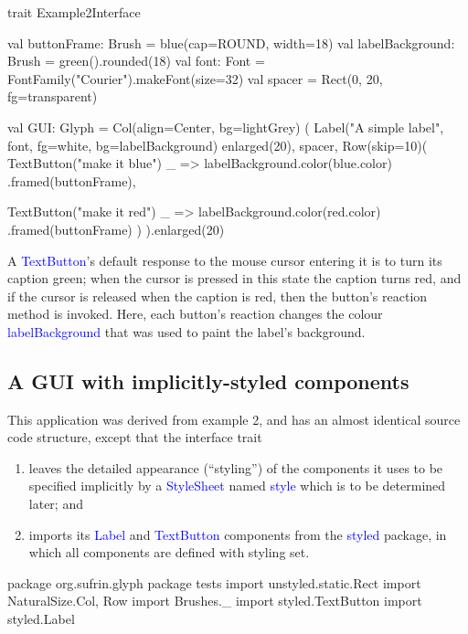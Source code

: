 \documentclass[12pt,a4paper]{article}
\def\Scala#1{\textcolor{blue}{\textsf{#1}}}
\def\SS#1{\subsection{#1}}
\begin{document}
\begin{scala}
trait Example2Interface {
  val buttonFrame: Brush =
        blue(cap=ROUND, width=18)
  val labelBackground: Brush =
        green().rounded(18)
  val font: Font  =
        FontFamily("Courier").makeFont(size=32)
  val spacer =
      Rect(0, 20, fg=transparent)

  val GUI: Glyph = Col(align=Center, bg=lightGrey) (
    Label("A simple label", font,
          fg=white,
          bg=labelBackground) enlarged(20),
    spacer,
    Row(skip=10)(
        TextButton("make it blue")
           { _ => labelBackground.color(blue.color) }
           .framed(buttonFrame),
           
        TextButton("make it red")
           { _ => labelBackground.color(red.color) }
           .framed(buttonFrame)
    )
  ).enlarged(20)
}
\end{scala}

A \Scala{TextButton}'s default response to the mouse cursor entering
it is to turn its caption green; when the cursor is pressed in this
state the caption turns red, and if the cursor is released when the
caption is red, then the button's reaction method is invoked. Here,
each button's reaction changes the colour \Scala{labelBackground} that
was used to paint the label's background.




\clearpage
\SS{A GUI with implicitly-styled components}

This application was derived from example 2, and has an almost
identical source code structure, except that the interface trait
\begin{enumerate}
\item leaves the detailed appearance (``styling'') of the
      components it uses to be specified implicitly by a
      \Scala{StyleSheet} named \Scala{style}
      which is to be determined later; and
\item imports its \Scala{Label} and \Scala{TextButton}
      components from the \Scala{styled} package, in which
      all components are defined with styling set. 
\end{enumerate}

\begin{scala}
package org.sufrin.glyph
package tests
import unstyled.static.Rect
import NaturalSize.{Col, Row}
import Brushes._
import styled.TextButton
import styled.Label
\end{scala}
\end{document}
